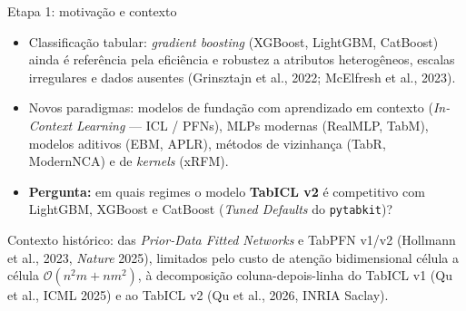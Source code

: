 \documentclass[aspectratio=169,11pt]{beamer}
\begin{document}
\begin{frame}{Etapa 1: motivação e contexto}
    \begin{itemize}
        \item Classificação tabular: \textit{gradient boosting} (XGBoost, LightGBM, CatBoost) ainda é referência pela eficiência e robustez a atributos heterogêneos, escalas irregulares e dados ausentes (Grinsztajn et al., 2022; McElfresh et al., 2023).
        \item Novos paradigmas: modelos de fundação com aprendizado em contexto (\textit{In-Context Learning} --- ICL / PFNs), MLPs modernas (RealMLP, TabM), modelos aditivos (EBM, APLR), métodos de vizinhança (TabR, ModernNCA) e de \textit{kernels} (xRFM).
        \item \textbf{Pergunta:} em quais regimes o modelo \textbf{TabICL v2} é competitivo com LightGBM, XGBoost e CatBoost (\textit{Tuned Defaults} do \texttt{pytabkit})?
    \end{itemize}
    \vspace{0.4em}
    \footnotesize Contexto histórico: das \textit{Prior-Data Fitted Networks} e TabPFN v1/v2 (Hollmann et al., 2023, \textit{Nature} 2025), limitados pelo custo de atenção bidimensional célula a célula $\mathcal{O}(n^2 m + n m^2)$, à decomposição coluna-depois-linha do TabICL v1 (Qu et al., ICML 2025) e ao TabICL v2 (Qu et al., 2026, INRIA Saclay).
\end{frame}
\end{document}
